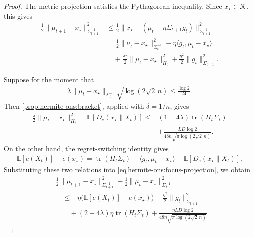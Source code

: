 \documentclass{article}
\theoremstyle{plain}
\theoremstyle{definition}
\theoremstyle{plain}
\newcommand{\tr}{\operatorname{tr}}
\newcommand{\E}{\mathbb E}
\newcommand{\cK}{\mathcal K}
\begin{document}
\begin{proof}
    The metric projection satisfies the Pythagorean inequality.
    Since $x_\star\in\cK$, this gives
    \begin{align}
        \frac12
        \|\mu_{t+1}-x_\star\|_{\Sigma_{t+1}^{-1}}^2
         & \leq
        \frac12
        \|x_\star-
        (\mu_t-\eta\Sigma_{t+1}g_t)\|_{\Sigma_{t+1}^{-1}}^2
        \nonumber \\
         & =
        \frac12
        \|\mu_t-x_\star\|_{\Sigma_t^{-1}}^2
        -\eta\langle g_t,\mu_t-x_\star\rangle
        \nonumber \\
         & \quad+
        \frac{\lambda\eta}{2}
        \|\mu_t-x_\star\|_{H_t}^2
        +
        \frac{\eta^2}{2}
        \|g_t\|_{\Sigma_{t+1}}^2.
        \label{eq:hermite-ons:focus-projection}
    \end{align}

    Suppose for the moment that
    \begin{align}
        \lambda
        \|\mu_t-x_\star\|_{\Sigma_t^{-1}}
        \sqrt{\log(2\sqrt2\,n)}
        \leq
        \frac{\log2}{24}.
        \label{eq:hermite-ons:focus-condition-round}
    \end{align}
    Then \cref{prop:hermite-ons:bracket}, applied with
    $\delta=1/n$, gives
    \begin{align}
        \frac{\lambda}{2}
        \|\mu_t-x_\star\|_{H_t}^2
        -
        \E[D_e(x_\star\|X_t)]
        \leq{} &
        (1-4\lambda)\tr(H_t\Sigma_t)
        \nonumber  \\
               & +
        \frac{LD\log2}
        {48n\sqrt{\pi\log(2\sqrt2\,n)}}.
        \label{eq:hermite-ons:focus-bracket-round}
    \end{align}
    On the other hand, the regret-switching identity gives
    \begin{align}
        \E[e(X_t)]-e(x_\star)
        =
        \tr(H_t\Sigma_t)
        +
        \langle g_t,\mu_t-x_\star\rangle
        -
        \E[D_e(x_\star\|X_t)].
    \end{align}
    Substituting these two relations into
    \eqref{eq:hermite-ons:focus-projection}, we obtain
    \begin{align}
         & \frac12
        \|\mu_{t+1}-x_\star\|_{\Sigma_{t+1}^{-1}}^2
        -
        \frac12
        \|\mu_t-x_\star\|_{\Sigma_t^{-1}}^2
        \nonumber    \\
         & \quad\leq
        -\eta\bigl(\E[e(X_t)]-e(x_\star)\bigr)
        +
        \frac{\eta^2}{2}
        \|g_t\|_{\Sigma_{t+1}}^2
        \nonumber    \\
         & \qquad+
        (2-4\lambda)\eta\tr(H_t\Sigma_t)
        +
        \frac{\eta LD\log2}
        {48n\sqrt{\pi\log(2\sqrt2\,n)}}.
        \label{eq:hermite-ons:focus-recursion}
    \end{align}


\end{proof}
\end{document}
